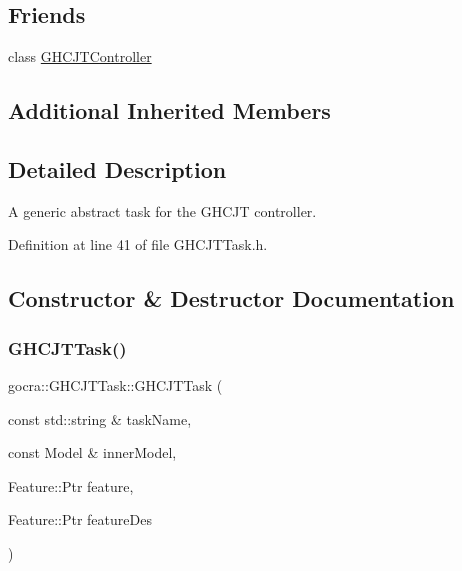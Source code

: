 \subsection*{Friends}
\begin{DoxyCompactItemize}
\item 
class \hyperlink{classgocra_1_1GHCJTTask_ad38e451271fa3f064d99a850190a56e7}{G\+H\+C\+J\+T\+Controller}
\end{DoxyCompactItemize}
\subsection*{Additional Inherited Members}


\subsection{Detailed Description}
A generic abstract task for the G\+H\+C\+JT controller. 



Definition at line 41 of file G\+H\+C\+J\+T\+Task.\+h.



\subsection{Constructor \& Destructor Documentation}
\hypertarget{classgocra_1_1GHCJTTask_a9161a72cfe5261e5a3580fba578ef23f}{}\label{classgocra_1_1GHCJTTask_a9161a72cfe5261e5a3580fba578ef23f} 
\subsubsection{\texorpdfstring{G\+H\+C\+J\+T\+Task()}{GHCJTTask()}\hspace{0.1cm}{\footnotesize\ttfamily [1/2]}}
{\footnotesize\ttfamily gocra\+::\+G\+H\+C\+J\+T\+Task\+::\+G\+H\+C\+J\+T\+Task (\begin{DoxyParamCaption}\item[{const std\+::string \&}]{task\+Name,  }\item[{const Model \&}]{inner\+Model,  }\item[{Feature\+::\+Ptr}]{feature,  }\item[{Feature\+::\+Ptr}]{feature\+Des }\end{DoxyParamCaption})}

